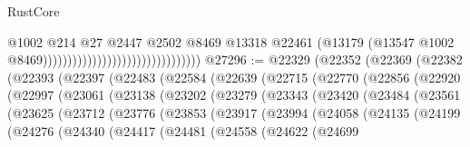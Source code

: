 \begin{lexlean}{RustCore}
\begin{coremodule}
                                                                @1002
                                                                @214
                                                                @27
                                                                @2447
                                                                @2502
                                                                @8469
                                                                @13318
                                                                @22461
                                                                (@13179
                                                                  (@13547
                                                                    @1002
                                                                    @8469))))))))))))))))))))))))))))))))
@27296 := @22329
    (@22352
      (@22369
        (@22382
          (@22393
            (@22397
              (@22483
                (@22584
                  (@22639
                    (@22715
                      (@22770
                        (@22856
                          (@22920
                            (@22997
                              (@23061
                                (@23138
                                  (@23202
                                    (@23279
                                      (@23343
                                        (@23420
                                          (@23484
                                            (@23561
                                              (@23625
                                                (@23712
                                                  (@23776
                                                    (@23853
                                                      (@23917
                                                        (@23994
                                                          (@24058
                                                            (@24135
                                                              (@24199
                                                                (@24276
                                                                  (@24340
                                                                    (@24417
                                                                      (@24481
                                                                        (@24558
                                                                          (@24622
                                                                            (@24699

\end{coremodule}
\end{lexlean}
